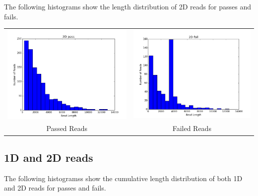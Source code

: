\documentclass[11pt]{article}
\begin{document}
        The following histograms show the length distribution of 2D reads for passes and fails.

        
        \begin{tabular}{cc}
          \includegraphics[width=.48\textwidth]{2Dpasses}
          &
          \includegraphics[width=.48\textwidth]{2Dfailures}
          \\
          Passed Reads
          &
          Failed Reads
        \end{tabular}

        
\subsection*{1D and 2D reads}

        The following histogramss show the cumulative length distribution of both 1D and 2D reads for passes and fails.
\end{document}
